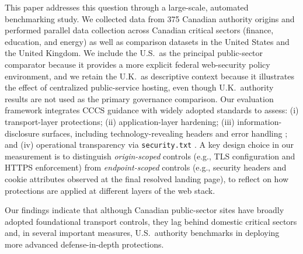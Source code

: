 \documentclass[a4paper,fleqn]{cas-sc}
\begin{document}
    This paper addresses this question through a large-scale, automated benchmarking study.
    We collected data from 375 Canadian authority origins and performed parallel data collection across Canadian critical sectors (finance, education, and energy) as well as comparison datasets in the United States and the United Kingdom. We include the U.S.\ as the principal public-sector comparator because it provides a more explicit federal web-security policy environment, and we retain the U.K.\ as descriptive context because it illustrates the effect of centralized public-service hosting, even though U.K.\ authority results are not used as the primary governance comparison.
    Our evaluation framework integrates CCCS guidance with widely adopted standards to assess: (i) transport-layer protections; (ii) application-layer hardening; (iii) information-disclosure surfaces, including technology-revealing headers and error handling \cite{owasp_secure_headers_project,cwe_209}; and (iv) operational transparency via \texttt{security.txt} \cite{rfc9116}. A key design choice in our measurement is to distinguish \emph{origin-scoped} controls (e.g., TLS configuration and HTTPS enforcement) from \emph{endpoint-scoped} controls (e.g., security headers and cookie attributes observed at the final resolved landing page), to reflect on how protections are applied at different layers of the web stack.


    Our findings indicate that although Canadian public-sector sites have broadly adopted foundational transport controls, they lag behind domestic critical sectors and, in several important measures, U.S.\ authority benchmarks in deploying more advanced defense-in-depth protections.
\end{document}
